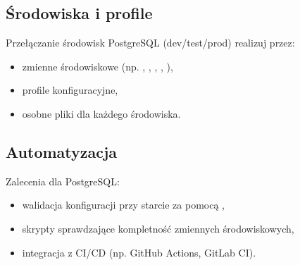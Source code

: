 \documentclass[a4paper,11pt,english,openany,oneside]{sphinxmanual}
\begin{document}
\sphinxAtStartPar
{}

\begin{sphinxVerbatim}[commandchars=\\\{\}]
\end{sphinxVerbatim}


\subsection{Środowiska i profile}
\label{\detokenize{rozdzial_2/rozdzial_22/index:srodowiska-i-profile}}
\sphinxAtStartPar
Przełączanie środowisk PostgreSQL (dev/test/prod) realizuj przez:
\begin{itemize}
\item {} 
\sphinxAtStartPar
zmienne środowiskowe (np. , , , , ),

\item {} 
\sphinxAtStartPar
profile konfiguracyjne,

\item {} 
\sphinxAtStartPar
osobne pliki  dla każdego środowiska.

\end{itemize}


\subsection{Automatyzacja}
\label{\detokenize{rozdzial_2/rozdzial_22/index:automatyzacja}}
\sphinxAtStartPar
Zalecenia dla PostgreSQL:
\begin{itemize}
\item {} 
\sphinxAtStartPar
walidacja konfiguracji przy starcie za pomocą ,

\item {} 
\sphinxAtStartPar
skrypty sprawdzające kompletność zmiennych środowiskowych,

\item {} 
\sphinxAtStartPar
integracja z CI/CD (np. GitHub Actions, GitLab CI).

\end{itemize}
\end{document}
